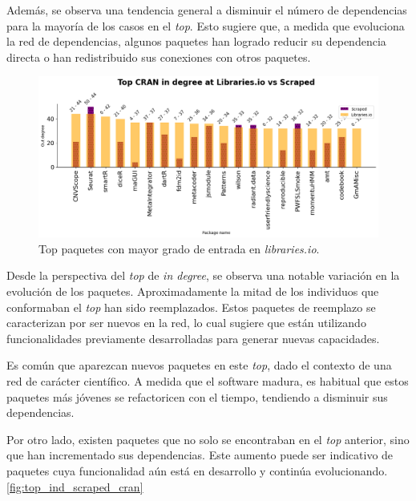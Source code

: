 Además, se observa una tendencia general a disminuir el número de dependencias para la mayoría de
los casos en el \textit{top}. Esto sugiere que, a medida que evoluciona la red de dependencias,
algunos paquetes han logrado reducir su dependencia directa o han redistribuido sus conexiones
con otros paquetes.


\begin{figure}[h!]
    \begin{center}
        \includegraphics[width=1\textwidth]{img/cran/top_ind_libio.png}
        \caption{Top paquetes con mayor grado de entrada en \textit{libraries.io}.}
        \label{fig:top_ind_libio_cran}
    \end{center}
\end{figure}


Desde la perspectiva del \textit{top} de \textit{in degree}, se observa una notable variación en
la evolución de los paquetes. Aproximadamente la mitad de los individuos que conformaban el
\textit{top} han sido reemplazados. Estos paquetes de reemplazo se caracterizan por ser nuevos
en la red, lo cual sugiere que están utilizando funcionalidades previamente desarrolladas para
generar nuevas capacidades.

Es común que aparezcan nuevos paquetes en este \textit{top}, dado el contexto de una red de
carácter científico. A medida que el software madura, es habitual que estos paquetes más
jóvenes se refactoricen con el tiempo, tendiendo a disminuir sus dependencias.

Por otro lado, existen paquetes que no solo se encontraban en el \textit{top} anterior,
sino que han incrementado sus dependencias. Este aumento puede ser indicativo de paquetes
cuya funcionalidad aún está en desarrollo y continúa evolucionando. \ref{fig:top_ind_scraped_cran}

